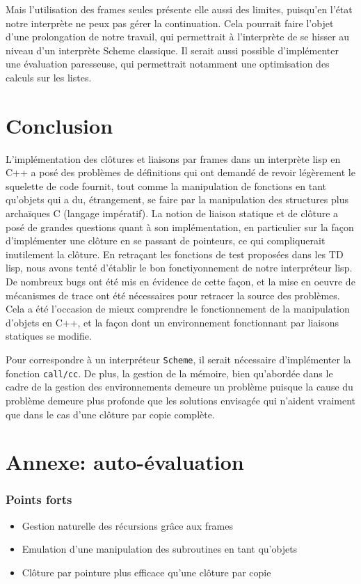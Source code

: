\documentclass[a4paper,11pt]{article}
\begin{document}
Mais l'utilisation des frames seules présente elle aussi des limites, puisqu'en l'état 
notre interprète ne peux pas gérer la continuation. Cela pourrait faire l'objet d'une 
prolongation de notre travail, qui permettrait à l'interprète de se hisser au niveau 
d'un interprète Scheme classique. Il serait aussi possible d'implémenter une évaluation 
paresseuse, qui permettrait notamment une optimisation des calculs sur les listes.

\section*{Conclusion}

L'implémentation des clôtures et liaisons par frames dans un interprète lisp en
C++ a posé des problèmes de définitions qui ont demandé de revoir légèrement le
squelette de code fournit, tout comme la manipulation de fonctions en tant
qu'objets qui a du, étrangement, se faire par la manipulation des structures
plus archaïques C (langage impératif). La notion de liaison statique et de clôture a posé de
grandes questions quant à son implémentation, en particulier sur la façon
d'implémenter une clôture en se passant de pointeurs, ce qui compliquerait
inutilement la clôture.
En retraçant les fonctions de test proposées dans les TD lisp, nous avons tenté
d'établir le bon fonctiyonnement de notre interpréteur lisp. De nombreux bugs ont
été mis en évidence de cette façon, et la mise en oeuvre de mécanismes de trace
ont été nécessaires pour retracer la source des problèmes. Cela a été l'occasion
de mieux comprendre le fonctionnement de la manipulation d'objets en C++, et la
façon dont un environnement fonctionnant par liaisons statiques se modifie.

Pour correspondre à un interpréteur \texttt{Scheme}, il serait nécessaire
d'implémenter la fonction \texttt{call/cc}. De plus, la gestion de la mémoire,
bien qu'abordée dans le cadre de la gestion des environnements demeure un
problème puisque la cause du problème demeure plus profonde que les solutions
envisagée qui n'aident vraiment que dans le cas d'une clôture par copie complète.

\section*{Annexe: auto-évaluation}

\subsubsection*{Points forts}
\begin{itemize}
\item Gestion naturelle des récursions grâce aux frames
\item Emulation d'une manipulation des subroutines en tant qu'objets
\item Clôture par pointure plus efficace qu'une clôture par copie
\end{itemize}
\end{document}
